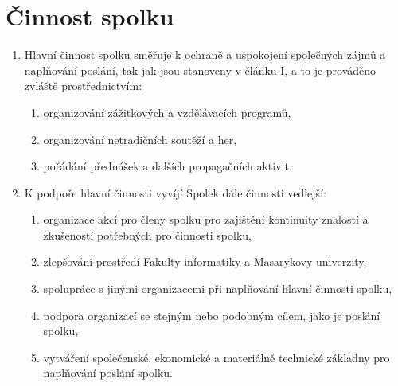 \documentclass[11pt]{article}
\begin{document}
\section{Činnost spolku}
\begin{enumerate}
    \item Hlavní činnost spolku směřuje k ochraně a uspokojení společných zájmů 
    a naplňování poslání, tak jak jsou stanoveny v článku I, a to je prováděno 
    zvláště prostřednictvím: 
    \begin{enumerate}
        \item organizování zážitkových a vzdělávacích programů,
        \item organizování netradičních soutěží a her,
        \item pořádání přednášek a dalších propagačních aktivit.
    \end{enumerate}
    \item K podpoře hlavní činnosti vyvíjí Spolek dále činnosti vedlejší: 
    \begin{enumerate}
        \item organizace akcí pro členy spolku pro zajištění kontinuity znalostí
         a zkušeností potřebných pro činnosti spolku,
        \item zlepšování prostředí Fakulty informatiky a Masarykovy univerzity,
        \item spolupráce s jinými organizacemi při naplňování hlavní činnosti 
        spolku,
        \item podpora organizací se stejným nebo podobným cílem, jako je 
        poslání spolku,
        \item vytváření společenské, ekonomické a materiálně technické 
        základny pro naplňování poslání spolku.
    \end{enumerate}
\end{enumerate}
\end{document}

